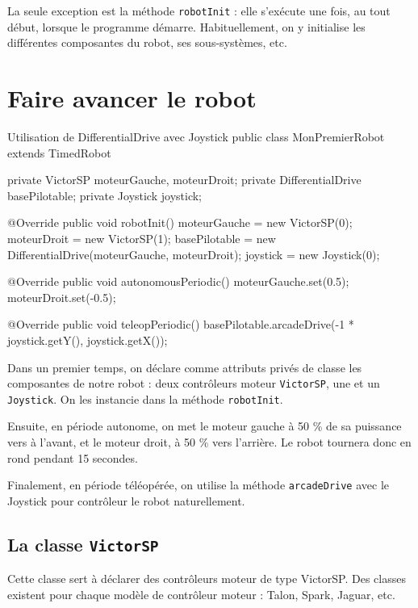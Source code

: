 \documentclass[12pt]{report}
\begin{document}
La seule exception est la méthode \texttt{robotInit} : elle s'exécute une fois, au tout début, lorsque le programme démarre. Habituellement, on y initialise les différentes composantes du robot, ses sous-systèmes, etc.

\section{Faire avancer le robot}

\begin{MyTCB}{Utilisation de DifferentialDrive avec Joystick}
public class MonPremierRobot extends TimedRobot {
	
	private VictorSP moteurGauche, moteurDroit;
	private DifferentialDrive basePilotable;
	private Joystick joystick;
	
	@Override
	public void robotInit() {
		moteurGauche = new VictorSP(0);
		moteurDroit = new VictorSP(1);
		basePilotable = new DifferentialDrive(moteurGauche, moteurDroit);
		joystick = new Joystick(0);
	}
	
	@Override
	public void autonomousPeriodic() {
		moteurGauche.set(0.5);
		moteurDroit.set(-0.5);
	}
	
	
	@Override
	public void teleopPeriodic() {
		basePilotable.arcadeDrive(-1 * joystick.getY(), joystick.getX());
	}

}

\end{MyTCB}

Dans un premier temps, on déclare comme attributs privés de classe les composantes de notre robot : deux contrôleurs moteur \texttt{VictorSP}, une  et un \texttt{Joystick}. On les instancie dans la méthode \texttt{robotInit}.

Ensuite, en période autonome, on met le moteur gauche à 50 \% de sa puissance vers à l'avant, et le moteur droit, à 50 \% vers l'arrière. Le robot tournera donc en rond pendant 15 secondes.

Finalement, en période téléopérée, on utilise la méthode \texttt{arcadeDrive} avec le Joystick pour contrôleur le robot naturellement. 

\subsection{La classe \texttt{VictorSP}}
Cette classe sert à déclarer des contrôleurs moteur de type VictorSP. Des classes existent pour chaque modèle de contrôleur moteur : Talon, Spark, Jaguar, etc.
\end{document}
